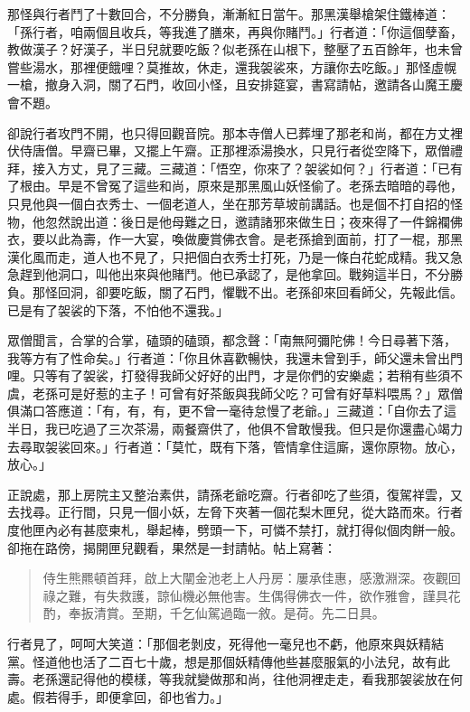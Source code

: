 那怪與行者鬥了十數回合，不分勝負，漸漸紅日當午。那黑漢舉槍架住鐵棒道：「孫行者，咱兩個且收兵，等我進了膳來，再與你賭鬥。」行者道：「你這個孽畜，教做漢子？好漢子，半日兒就要吃飯？似老孫在山根下，整壓了五百餘年，也未曾嘗些湯水，那裡便餓哩？莫推故，休走，還我袈裟來，方讓你去吃飯。」那怪虛幌一槍，撤身入洞，關了石門，收回小怪，且安排筵宴，書寫請帖，邀請各山魔王慶會不題。

卻說行者攻門不開，也只得回觀音院。那本寺僧人已葬埋了那老和尚，都在方丈裡伏侍唐僧。早齋已畢，又擺上午齋。正那裡添湯換水，只見行者從空降下，眾僧禮拜，接入方丈，見了三藏。三藏道：「悟空，你來了？袈裟如何？」行者道：「已有了根由。早是不曾冤了這些和尚，原來是那黑風山妖怪偷了。老孫去暗暗的尋他，只見他與一個白衣秀士、一個老道人，坐在那芳草坡前講話。也是個不打自招的怪物，他忽然說出道：後日是他母難之日，邀請諸邪來做生日；夜來得了一件錦襴佛衣，要以此為壽，作一大宴，喚做慶賞佛衣會。是老孫搶到面前，打了一棍，那黑漢化風而走，道人也不見了，只把個白衣秀士打死，乃是一條白花蛇成精。我又急急趕到他洞口，叫他出來與他賭鬥。他已承認了，是他拿回。戰夠這半日，不分勝負。那怪回洞，卻要吃飯，關了石門，懼戰不出。老孫卻來回看師父，先報此信。已是有了袈裟的下落，不怕他不還我。」

眾僧聞言，合掌的合掌，磕頭的磕頭，都念聲：「南無阿彌陀佛！今日尋著下落，我等方有了性命矣。」行者道：「你且休喜歡暢快，我還未曾到手，師父還未曾出門哩。只等有了袈裟，打發得我師父好好的出門，才是你們的安樂處；若稍有些須不虞，老孫可是好惹的主子！可曾有好茶飯與我師父吃？可曾有好草料喂馬？」眾僧俱滿口答應道：「有，有，有，更不曾一毫待怠慢了老爺。」三藏道：「自你去了這半日，我已吃過了三次茶湯，兩餐齋供了，他俱不曾敢慢我。但只是你還盡心竭力去尋取袈裟回來。」行者道：「莫忙，既有下落，管情拿住這廝，還你原物。放心，放心。」

正說處，那上房院主又整治素供，請孫老爺吃齋。行者卻吃了些須，復駕祥雲，又去找尋。正行間，只見一個小妖，左脅下夾著一個花梨木匣兒，從大路而來。行者度他匣內必有甚麼柬札，舉起棒，劈頭一下，可憐不禁打，就打得似個肉餅一般。卻拖在路傍，揭開匣兒觀看，果然是一封請帖。帖上寫著：
\begin{quote}
侍生熊羆頓首拜，啟上大闡金池老上人丹房：屢承佳惠，感激淵深。夜觀回祿之難，有失救護，諒仙機必無他害。生偶得佛衣一件，欲作雅會，謹具花酌，奉扳清賞。至期，千乞仙駕過臨一敘。是荷。先二日具。
\end{quote}

行者見了，呵呵大笑道：「那個老剝皮，死得他一毫兒也不虧，他原來與妖精結黨。怪道他也活了二百七十歲，想是那個妖精傳他些甚麼服氣的小法兒，故有此壽。老孫還記得他的模樣，等我就變做那和尚，往他洞裡走走，看我那袈裟放在何處。假若得手，即便拿回，卻也省力。」

